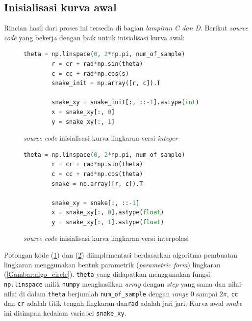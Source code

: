 \subsection{Inisialisasi kurva awal}
Rincian hasil dari proses ini tersedia di bagian \emph{lampiran C dan D}. Berikut \emph{source code} yang bekerja dengan baik untuk inisialisasi kurva awal:
\begin{figure}[H]
	\begin{lstlisting}[language=Python, basicstyle=\tiny]
		theta = np.linspace(0, 2*np.pi, num_of_sample)
		r = cr + rad*np.sin(theta)
		c = cc + rad*np.cos(s)
		snake_init = np.array([r, c]).T
		
		snake_xy = snake_init[:, ::-1].astype(int)
		x = snake_xy[:, 0]
		y = snake_xy[:, 1]
	\end{lstlisting}
	\caption{\emph{source code} inisialisasi kurva lingkaran versi \emph{integer}}
	\label{Gambar:circle_integer}
\end{figure}
\begin{figure}[H]
	\begin{lstlisting}[language=Python, basicstyle=\tiny]
		theta = np.linspace(0, 2*np.pi, num_of_sample)
		r = cr + rad*np.sin(theta)
		c = cc + rad*np.cos(theta)
		snake = np.array([r, c]).T
		
		snake_xy = snake[:, ::-1]
		x = snake_xy[:, 0].astype(float)
		y = snake_xy[:, 1].astype(float)
	\end{lstlisting}
	\caption{\emph{source code} inisialisasi kurva lingkaran versi interpolasi}
	\label{Gambar:circle_float}
\end{figure}
Potongan kode (\ref{Gambar:circle_integer}) dan (\ref{Gambar:circle_float}) diimplementasi berdasarkan algoritma pembuatan lingkaran menggunakan bentuk parametrik (\emph{parametric form}) lingkaran (\ref{Gambar:algo_circle}). \texttt{theta} yang didapatkan menggunakan fungsi \texttt{np.linspace} milik \texttt{numpy} menghasilkan \emph{array} dengan \emph{step} yang sama dan nilai-nilai di dalam \texttt{theta} berjumlah \texttt{num\_of\_sample} dengan \emph{range} $0$ sampai $2 \pi$, \texttt{cc} dan \texttt{cr} adalah titik tengah lingkaran dan\texttt{rad} adalah jari-jari. Kurva awal \emph{snake} ini disimpan kedalam variabel \texttt{snake\_xy}.

